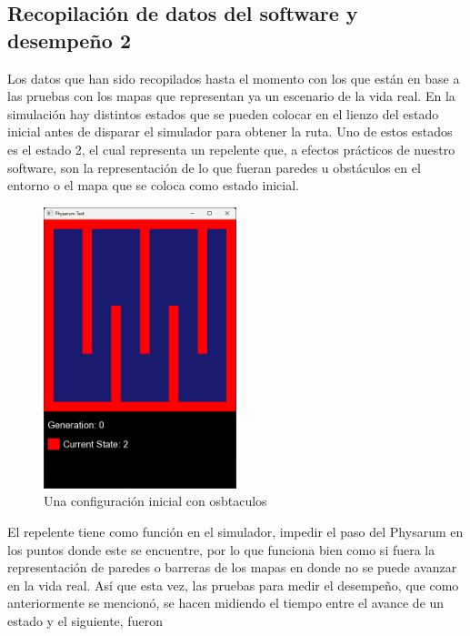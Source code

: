\subsection{Recopilaci\'on de datos del software y desempe\~no 2}
    Los datos que han sido recopilados hasta el momento con los
        que est\'an en base a las pruebas con los mapas que
        representan ya un escenario de la vida real. En la simulaci\'on
        hay distintos estados que se pueden colocar en el lienzo del
        estado inicial antes de disparar el simulador para obtener la
        ruta. Uno de estos estados es el estado 2, el cual representa
        un repelente que, a efectos pr\'acticos de nuestro software, son
        la representaci\'on de lo que fueran paredes u obst\'aculos en el
        entorno o el mapa que se coloca como estado inicial.
    \vskip 0.5cm
    \begin{figure}[htbp]
        \centering
        \includegraphics[width=0.5\textwidth]{./images/Pruebas/simulador/image059.png}
        \caption{Una configuraci\'on inicial con osbtaculos}
        \label{fig:Ruta 59}
    \end{figure}
    \vskip 0.5cm
    El repelente tiene como funci\'on en el simulador, impedir el
        paso del Physarum en los puntos donde este se encuentre,
        por lo que funciona bien como si fuera la representaci\'on de
        paredes o barreras de los mapas en donde no se puede
        avanzar en la vida real.
        \vskip 0.5cm
    As\'i que esta vez, las pruebas para medir el desempe\~no, que
        como anteriormente se mencion\'o, se hacen midiendo el
        tiempo entre el avance de un estado y el siguiente, fueron
